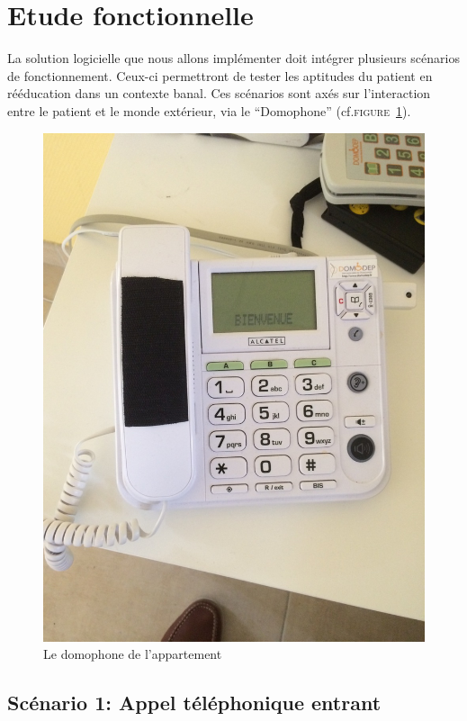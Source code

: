 \section{Etude fonctionnelle}

La solution logicielle que nous allons implémenter doit intégrer plusieurs scénarios de fonctionnement. Ceux-ci permettront de tester les aptitudes du patient en rééducation dans un contexte banal. Ces scénarios sont axés sur l'interaction entre le patient et le monde extérieur, via le \enquote{Domophone} (cf.\textsc{figure~\ref{domo}}).

\begin{figure}
  \includegraphics[scale=0.15, bb = 0 50 960 1230]{1-PreEtude/img/domophone_photo}
  \caption{Le domophone de l'appartement}
  \label{domo}
\end{figure}

\subsection{Scénario 1: Appel téléphonique entrant}

